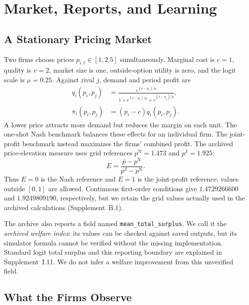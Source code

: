 \documentclass{article}
\begin{document}
\section{Market, Reports, and Learning}

\subsection{A Stationary Pricing Market}

Two firms choose prices $p_{i,t}\in[1,2.5]$ simultaneously. Marginal cost is $c=1$, quality is $v=2$, market size is one, outside-option utility is zero, and the logit scale is $\mu=0.25$. Against rival $j$, demand and period profit are
\begin{align}
q_i(p_i,p_j)&=\frac{e^{(v-p_i)/\mu}}{1+e^{(v-p_i)/\mu}+e^{(v-p_j)/\mu}},\label{eq:demand}\\
\pi_i(p_i,p_j)&=(p_i-c)q_i(p_i,p_j).\label{eq:profit}
\end{align}
A lower price attracts more demand but reduces the margin on each unit. The one-shot Nash benchmark balances these effects for an individual firm. The joint-profit benchmark instead maximizes the firms' combined profit. The archived price-elevation measure uses grid references $p^{\mathrm N}=1.473$ and $p^{\mathrm J}=1.925$:
\begin{equation}
E=\frac{\bar p-p^{\mathrm N}}{p^{\mathrm J}-p^{\mathrm N}}.\label{eq:elevation}
\end{equation}
Thus $E=0$ is the Nash reference and $E=1$ is the joint-profit reference; values outside $[0,1]$ are allowed. Continuous first-order conditions give $1.4729266600$ and $1.9249809190$, respectively, but we retain the grid values actually used in the archived calculations (Supplement~B.1).

The archive also reports a field named \texttt{mean\_total\_surplus}. We call it the \emph{archived welfare index}: its values can be checked against saved outputs, but its simulator formula cannot be verified without the missing implementation. Standard logit total surplus and this reporting boundary are explained in Supplement~I.11. We do not infer a welfare improvement from this unverified field.

\subsection{What the Firms Observe}
\end{document}
